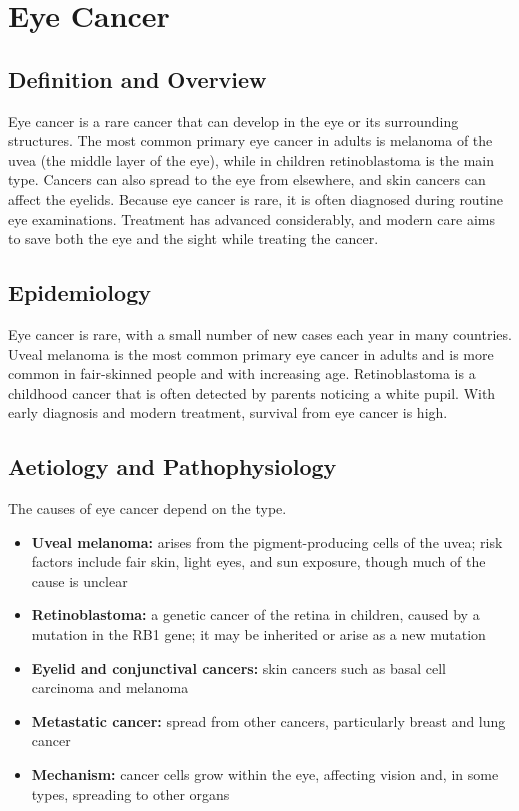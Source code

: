 \chapter{Eye Cancer}

\section*{Definition and Overview}
Eye cancer is a rare cancer that can develop in the eye or its surrounding structures. The most common primary eye cancer in adults is melanoma of the uvea (the middle layer of the eye), while in children retinoblastoma is the main type. Cancers can also spread to the eye from elsewhere, and skin cancers can affect the eyelids. Because eye cancer is rare, it is often diagnosed during routine eye examinations. Treatment has advanced considerably, and modern care aims to save both the eye and the sight while treating the cancer.

\section*{Epidemiology}
Eye cancer is rare, with a small number of new cases each year in many countries. Uveal melanoma is the most common primary eye cancer in adults and is more common in fair-skinned people and with increasing age. Retinoblastoma is a childhood cancer that is often detected by parents noticing a white pupil. With early diagnosis and modern treatment, survival from eye cancer is high.

\section*{Aetiology and Pathophysiology}
The causes of eye cancer depend on the type.
\begin{itemize}
    \item \textbf{Uveal melanoma:} arises from the pigment-producing cells of the uvea; risk factors include fair skin, light eyes, and sun exposure, though much of the cause is unclear
    \item \textbf{Retinoblastoma:} a genetic cancer of the retina in children, caused by a mutation in the RB1 gene; it may be inherited or arise as a new mutation
    \item \textbf{Eyelid and conjunctival cancers:} skin cancers such as basal cell carcinoma and melanoma
    \item \textbf{Metastatic cancer:} spread from other cancers, particularly breast and lung cancer
    \item \textbf{Mechanism:} cancer cells grow within the eye, affecting vision and, in some types, spreading to other organs
\end{itemize}

